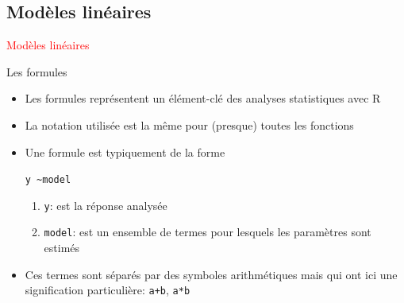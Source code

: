 \documentclass[11pt]{beamer}\usepackage[]{graphicx}\usepackage[]{color}
\makeatletter
\newcommand{\hlcom}[1]{\textcolor[rgb]{0.588,0.588,0.588}{#1}}%
\newcommand{\hlopt}[1]{\textcolor[rgb]{0.196,0.196,0.196}{#1}}%
\newcommand{\hlstd}[1]{\textcolor[rgb]{0.196,0.196,0.196}{#1}}%
\newcommand{\hlkwb}[1]{\textcolor[rgb]{0.627,0,0.314}{#1}}%
\newcommand{\hlkwc}[1]{\textcolor[rgb]{0,0.631,0.314}{#1}}%
\newcommand{\hlkwd}[1]{\textcolor[rgb]{0.78,0.227,0.412}{#1}}%
\newenvironment{kframe}{%
 \def\at@end@of@kframe{}%
 \ifinner\ifhmode%
  \def\at@end@of@kframe{\end{minipage}}%
  \begin{minipage}{\columnwidth}%
 \fi\fi%
 \def\FrameCommand##1{\hskip\@totalleftmargin \hskip-\fboxsep
 \colorbox{shadecolor}{##1}\hskip-\fboxsep
     \hskip-\linewidth \hskip-\@totalleftmargin \hskip\columnwidth}%
 \MakeFramed {\advance\hsize-\width
   \@totalleftmargin\z@ \linewidth\hsize
   \@setminipage}}%
 {\par\unskip\endMakeFramed%
 \at@end@of@kframe}
\newenvironment{knitrout}{}{} %
\newtheorem{rcode}{R code}[section]
\newcommand{\code}[1]{\texttt{#1}}
\makeatother
\begin{document}




\subsection{Modèles linéaires}

\begin{frame}
 \begin{center}
  \Huge{\textcolor{red}{Modèles linéaires}}
 \end{center}
\end{frame}


\begin{frame}[fragile]{Les formules}

\begin{itemize}
  \setlength\itemsep{1.5em}
  \item Les formules représentent un élément-clé des analyses statistiques avec R
  \item La notation utilisée est la m\^{e}me pour (presque) toutes les fonctions
  \item Une formule est typiquement de la forme 
  \begin{center}
  \code{y \sim model}
  \end{center} 
  \pause \begin{enumerate}
  \item \code{y}: est la réponse analysée 
  \item \code{model}: est un ensemble de termes pour lesquels les paramètres sont estimés
  \end{enumerate}
  \pause \item Ces termes sont séparés par des symboles arithmétiques mais qui ont ici une signification
  particulière: \code{a+b}, \code{a*b}
 \end{itemize}
\end{frame}
\end{document}
